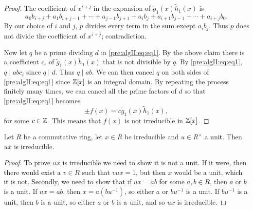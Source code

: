 \documentclass[10pt, a4paper]{article}
\begin{document}
\begin{theorem}
\begin{proof}
        The coefficient of $x ^ {i + j}$ in the expansion of $\tilde{g}_1(x)\tilde{h}_1(x)$ is
        \[
        a_0b_{i + j} + a_1b_{i + j - 1} + \dotsi + a_{j - 1}b_{j + 1} + a_ib_j + a_{i + 1}b_{j - 1} + \dotsi + a_{i + j}b_0.
        \]
        By our choice of $i$ and $j$,
        $p$ divides every term in the sum except $a_ib_j$.
        Thus $p$ does not divide the coefficient of $x ^ {i + j}$;
        contradiction.

        Now let $q$ be a prime dividing $d$ in \eqref{pre:algII:eq:eq1}.
        By the above claim there is a coefficient $c_i$ of $\tilde{g}_1(x)\tilde{h}_1(x)$ that is not divisible by $q$.
        By \eqref{pre:algII:eq:eq1},
        $q \mid abc_i$ since $q \mid d$.
        Thus $q \mid ab$.
        We can then cancel $q$ on both sides of \eqref{pre:algII:eq:eq1} since $\mathbb{Z}[x]$ is an integral domain.
        By repeating the process finitely many times,
        we can cancel all the prime factors of $d$ so that \eqref{pre:algII:eq:eq1} becomes
        \[
        \pm f(x) = c\tilde{g}_1(x)\tilde{h}_1(x),
        \]
        for some $c \in \mathbb{Z}$.
        This means that $f(x)$ is not irreducible in $\mathbb{Z}[x]$.
    \end{proof}
\end{theorem}

\begin{lemma}\label{pre:algII:lem:xirreduunituxirred}
    Let $R$ be a commutative ring,
    let $x \in R$ be irreducible and $u \in R ^ {\times}$ a unit.
    Then $ux$ is irreducible.

    \begin{proof}
        To prove $ux$ is irreducible we need to show it is not a unit.
        If it were,
        then there would exist a $v \in R$ such that $vux = 1$,
        but then $x$ would be a unit,
        which it is not.
        Secondly,
        we need to show that if $ux = ab$ for some $a, b \in R$,
        then $a$ or $b$ is a unit.
        If $ux = ab$,
        then $x = a(bu ^ {-1})$,
        so either $a$ or $bu ^ {-1}$ is a unit.
        If $bu ^ {-1}$ is a unit,
        then $b$ is a unit,
        so either $a$ or $b$ is a unit,
        and so $ux$ is irreducible.
    \end{proof}
\end{lemma}
\end{document}
